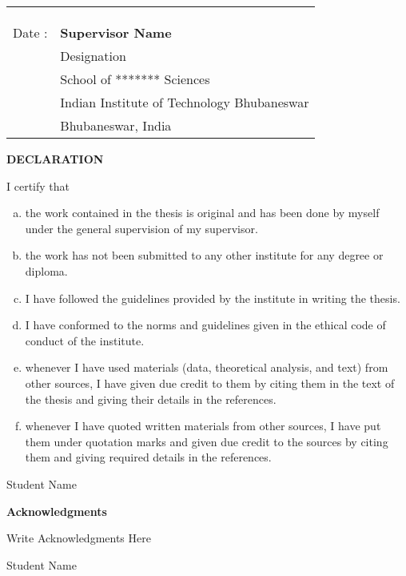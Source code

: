 \begin{tabular*}{\textwidth}{@{\extracolsep{\fill}}ll}
	&\\
	&\\
	&\\
	Date : & \textbf{Supervisor Name}\\
	& Designation\\
	& School of ******* Sciences \\
	& Indian Institute of Technology Bhubaneswar \\
	& Bhubaneswar, India \\
\end{tabular*}



\newpage

\thispagestyle{empty}
\begin{center}
	\textbf{\Large DECLARATION}
\end{center}
I certify that
\begin{enumerate}[a.]
	\item the work contained in the thesis is original and has been done by myself under the general supervision of my supervisor.
	\item the work has not been submitted to any other institute for any degree or diploma.
	\item I have followed the guidelines provided by the institute in writing the thesis.
	\item I have conformed to the norms and guidelines given in the ethical code of conduct of the institute.
	\item whenever I have used materials (data, theoretical analysis, and text) from other sources, I have given due credit to them by citing them in the text of the thesis and giving their details in the references.
	\item whenever I have quoted written materials from other sources, I have put them under quotation marks and given due credit to the sources by citing them and giving required details in the references.
\end{enumerate}
\vspace{4em}
\begin{flushright}
	Student Name
\end{flushright}

\newpage


\thispagestyle{empty}
\begin{center}
	\textbf{\Large Acknowledgments}
\end{center}

Write Acknowledgments Here


\vspace{3em}
\begin{flushright}
	Student Name
\end{flushright}

